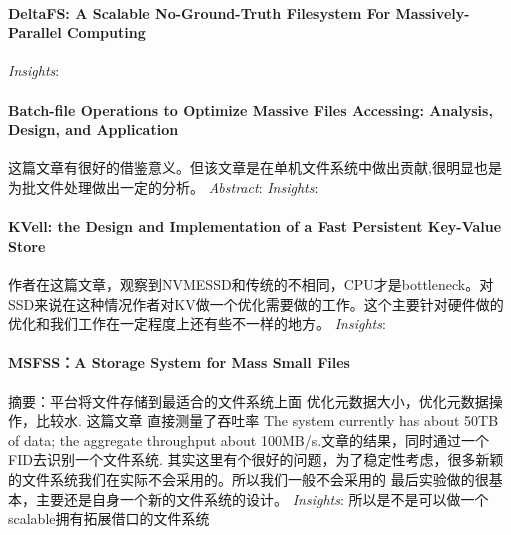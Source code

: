 \documentclass[8pt,UTF8]{article}
\begin{document}
            \paragraph{DeltaFS: A Scalable No-Ground-Truth Filesystem For Massively-Parallel Computing}
                \emph{Insights}:
            \paragraph{Batch-file Operations to Optimize Massive Files Accessing: Analysis, Design, and Application}
                这篇文章有很好的借鉴意义。但该文章是在单机文件系统中做出贡献,很明显也是为批文件处理做出一定的分析。
                \emph{Abstract}:
                \emph{Insights}:
            \paragraph{KVell: the Design and Implementation of a Fast Persistent Key-Value Store}
                作者在这篇文章，观察到NVMESSD和传统的不相同，CPU才是bottleneck。对SSD来说在这种情况作者对KV做一个优化需要做的工作。这个主要针对硬件做的优化和我们工作在一定程度上还有些不一样的地方。
                \emph{Insights}:
            \paragraph{MSFSS：A Storage System for Mass Small Files}
                摘要：平台将文件存储到最适合的文件系统上面 优化元数据大小，优化元数据操作，比较水. 这篇文章 直接测量了吞吐率 The system currently has about 50TB of data; the aggregate throughput about 100MB/s.文章的结果，同时通过一个FID去识别一个文件系统. 其实这里有个很好的问题，为了稳定性考虑，很多新颖的文件系统我们在实际不会采用的。所以我们一般不会采用的 最后实验做的很基本，主要还是自身一个新的文件系统的设计。
                \emph{Insights}: 所以是不是可以做一个scalable拥有拓展借口的文件系统
\end{document}
